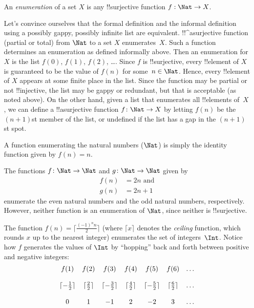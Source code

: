 \documentclass[../../../include/open-logic-section]{subfiles}
\begin{document}
\begin{defn}
An \emph{enumeration} of a set $X$ is any !!{surjective} function $f:
\Nat \rightarrow X$.
\end{defn}

\begin{explain}
Let's convince ourselves that the formal definition and the informal
definition using a possibly gappy, possibly infinite list are
equivalent. !!^a{surjective} function (partial or total) from $\Nat$ to
a set $X$ enumerates~$X$. Such a function determines an enumeration as
defined informally above. Then an enumeration for $X$ is the list
$f(0)$, $f(1)$, $f(2)$, \dots. Since $f$ is !!{surjective}, every
!!{element} of $X$ is guaranteed to be the value of $f(n)$ for some~$n
\in \Nat$. Hence, every !!{element} of $X$ appears at some finite
place in the list. Since the function may be partial or not !!{injective},
the list may be gappy or redundant, but that is acceptable (as noted
above). On the other hand, given a list that enumerates all
!!{element}s of~$X$, we can define a !!a{surjective} function $f\colon
\Nat \to X$ by letting $f(n)$ be the $(n+1)$st member of the list, or
undefined if the list has a gap in the $(n+1)$st spot.
\end{explain}

\begin{ex}
A function enumerating the natural numbers ($\Nat$) is
simply the identity function given by $f(n) = n$.
\end{ex}

\begin{ex}
The functions $f\colon \Nat \to \Nat$ and $g \colon \Nat \to \Nat$ given by
\begin{align}
f(n) & = 2n \text{ and}\\
g(n) & = 2n+1
\end{align}
enumerate the even natural numbers and the odd natural numbers,
respectively. However, neither function is an enumeration of
$\Nat$, since neither is !!{surjective}.
\end{ex}

\begin{ex}
The function $f(n) = \lceil \frac{(-1)^n n}{2}\rceil$ (where $\lceil x
\rceil$ denotes the \emph{ceiling} function, which rounds $x$ up to
the nearest integer) enumerates the set of integers~$\Int$. Notice
how $f$ generates the values of $\Int$ by ``hopping'' back and forth
between positive and negative integers:
\[
\begin{array}{c c c c c c c}
f(1) & f(2) & f(3) & f(4) & f(5) & f(6) & \dots \\ \\
\lceil - \tfrac{1}{2}\rceil & \lceil \tfrac{2}{2} \rceil & \lceil -
\tfrac{3}{2} \rceil & \lceil \tfrac{4}{2} \rceil  & \lceil -\tfrac{5}{2}
\rceil & \lceil \tfrac{6}{2} \rceil & \dots \\ \\
0 & 1 & -1 & 2 & -2 & 3 & \dots
\end{array}
\]
\end{ex}
\end{document}
